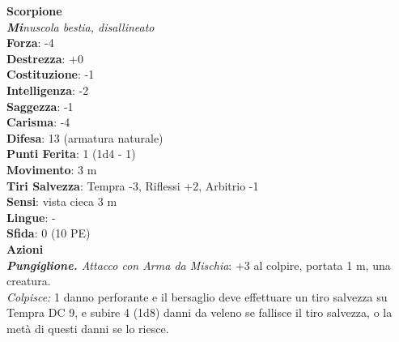 \begin{multicols}{2}
\medskip\textbf{Scorpione}\\
\emph{\textbf{Mi}nuscola bestia, disallineato}\\
\textbf{Forza}: -4\\
\textbf{Destrezza}: +0\\
\textbf{Costituzione}: -1\\
\textbf{Intelligenza}: -2\\
\textbf{Saggezza}: -1\\
\textbf{Carisma}: -4\\
\textbf{Difesa}: 13 (armatura naturale)\\
\textbf{Punti Ferita}: 1 (1d4 - 1)\\
\textbf{Movimento}: 3 m\\
\textbf{Tiri Salvezza}: Tempra -3, Riflessi +2, Arbitrio -1\\
\textbf{Sensi}: vista cieca 3 m\\
\textbf{Lingue}: -\\
\textbf{Sfida}: 0 (10 PE)\smallskip\\
\smallskip\textbf{Azioni}\\
\emph{\textbf{Pungiglione.} Attacco con Arma da Mischia}: +3 al colpire, portata 1 m, una creatura.\\
\emph{Colpisce:} 1 danno perforante e il bersaglio deve effettuare un tiro salvezza su Tempra DC 9, e subire 4 (1d8) danni da veleno se fallisce il tiro salvezza, o la metà di questi danni se lo riesce.\\


\end{multicols}
